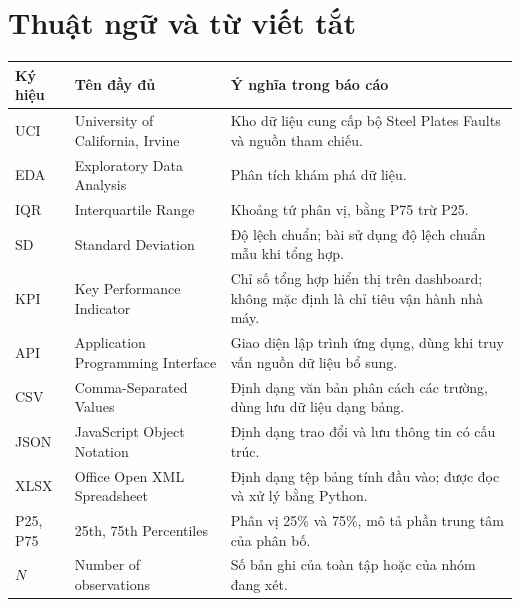 \documentclass[12pt,a4paper,oneside]{report}
\begin{document}
\renewcommand{\contentsname}{Mục lục}
\renewcommand{\listfigurename}{Danh mục hình vẽ}
\renewcommand{\listtablename}{Danh mục bảng biểu}

{}
\begingroup
{}
\setlength{\parskip}{0pt}
\tableofcontents
\endgroup

\clearpage
{}
{}
\listoffigures

\clearpage
{}
{}
\listoftables
\clearpage

\chapter*{Thuật ngữ và từ viết tắt}

\begin{center}
\small
\begin{tabularx}{\linewidth}{@{}p{1.5cm}Y Y@{}}
\toprule
\textbf{Ký hiệu} & \textbf{Tên đầy đủ} & \textbf{Ý nghĩa trong báo cáo} \\
\midrule
UCI & University of California, Irvine & Kho dữ liệu cung cấp bộ Steel Plates Faults và nguồn tham chiếu. \\
EDA & Exploratory Data Analysis & Phân tích khám phá dữ liệu. \\
IQR & Interquartile Range & Khoảng tứ phân vị, bằng P75 trừ P25. \\
SD & Standard Deviation & Độ lệch chuẩn; bài sử dụng độ lệch chuẩn mẫu khi tổng hợp. \\
KPI & Key Performance Indicator & Chỉ số tổng hợp hiển thị trên dashboard; không mặc định là chỉ tiêu vận hành nhà máy. \\
API & Application Programming Interface & Giao diện lập trình ứng dụng, dùng khi truy vấn nguồn dữ liệu bổ sung. \\
CSV & Comma-Separated Values & Định dạng văn bản phân cách các trường, dùng lưu dữ liệu dạng bảng. \\
JSON & JavaScript Object Notation & Định dạng trao đổi và lưu thông tin có cấu trúc. \\
XLSX & Office Open XML Spreadsheet & Định dạng tệp bảng tính đầu vào; được đọc và xử lý bằng Python. \\
P25, P75 & 25th, 75th Percentiles & Phân vị 25\% và 75\%, mô tả phần trung tâm của phân bố. \\
$N$ & Number of observations & Số bản ghi của toàn tập hoặc của nhóm đang xét. \\
\bottomrule
\end{tabularx}
\end{center}
\end{document}

